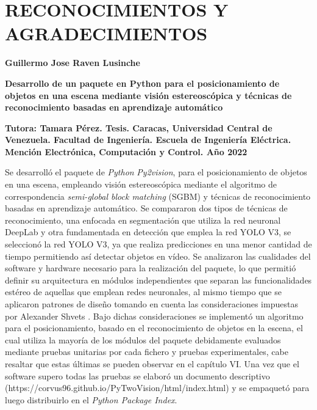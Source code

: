 \documentclass[letterpaper,titlepage,12pt,oneside,spanish,final]{report_eie}
\numberwithin{equation}{chapter}%
\numberwithin{figure}{chapter}%
\numberwithin{table}{chapter}%
\numberwithin{definition}{chapter}%
\numberwithin{lemma}{chapter}%
\numberwithin{theorem}{chapter}%
\numberwithin{corollary}{chapter}%
\numberwithin{condition}{chapter}%
\numberwithin{criterion}{chapter}%
\numberwithin{problem}{chapter}%
\numberwithin{property}{chapter}%
\numberwithin{proposition}{chapter}%
\numberwithin{solution}{chapter}%
\numberwithin{conjecture}{chapter}%
\begin{document}
\chapter*{RECONOCIMIENTOS Y AGRADECIMIENTOS}
%
%
\newpage
\renewcommand*{\abstract}{\begin{center}\end{center}}
\begin{spacing}{1}
\begin{center}%

\textbf{Guillermo Jose Raven Lusinche}

\begin{large}
\textbf{Desarrollo de un paquete en Python para el posicionamiento de objetos en una escena mediante visión estereoscópica y técnicas de reconocimiento basadas en aprendizaje automático}
\end{large}
\end{center}

\justifying
\textbf{Tutora: Tamara Pérez. Tesis.
Caracas, Universidad Central de Venezuela. Facultad de Ingeniería.
Escuela de Ingeniería Eléctrica. Mención Electrónica, Computación y Control. Año 2022}

Se desarrolló el paquete de \textit{Python} \textit{Py2vision}, para el posicionamiento de objetos en una escena, empleando visión estereoscópica mediante el algoritmo de correspondencia \textit{semi-global block matching} (SGBM) y técnicas de reconocimiento basadas en aprendizaje automático. Se compararon dos tipos de técnicas de reconocimiento, una enfocada en segmentación que utiliza la red neuronal DeepLab y otra fundamentada en detección que emplea la red YOLO V3, se seleccionó la red YOLO V3, ya que realiza predicciones en una menor cantidad de tiempo permitiendo así detectar objetos en vídeo. Se analizaron las cualidades del software y hardware necesario para la realización del paquete, lo que permitió definir su arquitectura en módulos independientes que separan las funcionalidades estéreo de aquellas que emplean redes neuronales, al mismo tiempo que se aplicaron patrones de diseño tomando en cuenta las consideraciones impuestas por Alexander Shvets \cite{shvets_2019}. Bajo dichas consideraciones se implementó un algoritmo para el posicionamiento, basado en el reconocimiento de objetos en la escena, el cual utiliza la mayoría de los módulos del paquete debidamente evaluados mediante pruebas unitarias por cada fichero y pruebas experimentales, cabe resaltar que estas últimas se pueden observar en el capítulo VI. Una vez que el software supero todas las pruebas se elaboró un documento descriptivo (https://corvus96.github.io/PyTwoVision/html/index.html) y se empaquetó para luego distribuirlo en el \textit{Python Package Index}.


\end{spacing}
\end{document}
